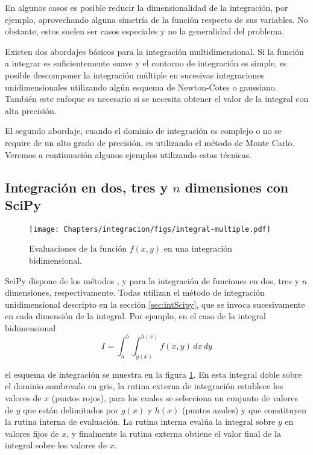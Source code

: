 En algunos casos es posible reducir la dimensionalidad de la integración, por ejemplo, aprovechando alguna simetría de la función respecto de sus variables. No obstante, estos suelen ser casos especiales y no la generalidad del problema.

Existen dos abordajes básicos para la integración multidimensional. Si la función a integrar es suficientemente suave y el contorno de integración es simple, es posible descomponer la integración múltiple en sucesivas integraciones unidimensionales utilizando algún esquema de Newton-Cotes o gaussiano. También este enfoque es necesario si se necesita obtener el valor de la integral con alta precisión.

El segundo abordaje, cuando el dominio de integración es complejo o no se require de un alto grado de precisión, es utilizando el método de Monte Carlo. Veremos a continuación algunos ejemplos utilizando estas técnicas.


\subsection{Integración en dos, tres y $n$ dimensiones con SciPy}

\begin{figure}[t]
 \centering
 \texttt{[image: Chapters/integracion/figs/integral-multiple.pdf]}
 \caption{Evaluaciones de la función $f(x, y)$ en una integración bidimensional.}
 \label{fig:int-2d}
\end{figure}

SciPy dispone de los métodos ,  y  para la integración de funciones en dos, tres y $n$ dimensiones, respectivamente. Todas utilizan el método de integración unidimensional  descripto en la sección \ref{sec:intScipy}, que se invoca sucesivamente en cada dimensión de la integral. Por ejemplo, en el caso de la integral bidimensional
\begin{equation}\label{eq:intmcmul01}
I = \int_{a}^{b} \int_{g(x)}^{h(x)} f(x, y) \, dx \, dy
\end{equation}

el esquema de integración se muestra en la figura \ref{fig:int-2d}. En esta integral doble sobre el dominio sombreado en gris, la rutina externa de integración establece los valores de $x$ (puntos rojos), para los cuales se selecciona un conjunto de valores de $y$ que están delimitados por $g(x)$ y $h(x)$ (puntos azules) y que constituyen la rutina interna de evaluación. La rutina interna evalúa la integral sobre $y$ en valores fijos de $x$, y finalmente la rutina externa obtiene el valor final de la integral sobre los valores de $x$.

